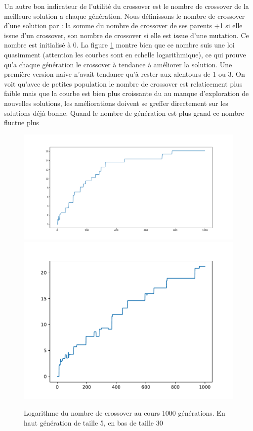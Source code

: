 \documentclass[10pt,a4paper]{article}
\begin{document}
Un autre bon indicateur de l'utilité du crossover est le nombre de crossover de la meilleure solution a chaque génération. Nous définissons le nombre de crossover d'une solution par : la somme du nombre de crossover de ses parents +1 si elle issue d'un crossover, son nombre de crossover si elle est issue d'une mutation. Ce nombre est initialisé à 0. La figure \ref{nbcrossover} montre bien que ce nombre suis une loi quasimment (attention les courbes sont en echelle logarithmique), ce qui prouve qu'a chaque génération le crossover à tendance à améliorer la solution. Une première version naive n'avait tendance qu'à rester aux alentours de 1 ou 3. On voit qu'avec de petites population le nombre de crossover est relaticement plus faible mais que la courbe est bien plus croissante du au manque d'exploration de nouvelles solutions, les améliorations doivent se greffer directement sur les solutions déjà bonne. Quand le nombre de génération est plus grand ce nombre fluctue plus 

\begin{figure}
\centering
\includegraphics[scale=.4]{images/nombre_fusion_log_5_1000.pdf}
\includegraphics[scale=.6]{images/nombre_fusion_log_30_1000.pdf}
\caption{Logarithme du nombre de crossover au cours 1000 générations. En haut génération de taille 5, en bas de taille 30}
\label{nbcrossover}
\end{figure}
\end{document}
